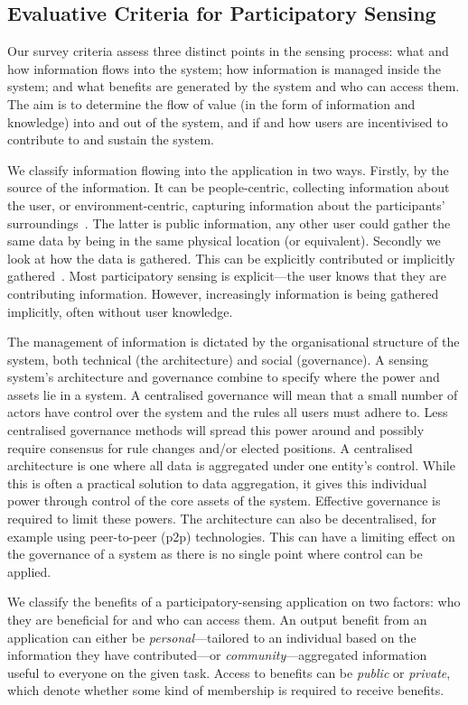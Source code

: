 \subsection{Evaluative Criteria for Participatory Sensing}

Our survey criteria assess three distinct points in the sensing process: what and how information flows into the system; how information is managed inside the system; and what benefits are generated by the system and who can access them. The aim is to determine the flow of value (in the form of information and knowledge) into and out of the system, and if and how users are incentivised to contribute to and sustain the system.

We classify information flowing into the application in two ways. 
Firstly, by the source of the information. It can be people-centric, collecting information about the user, or environment-centric, capturing information about the participants' surroundings~\citep{Kanhere2013}. The latter is public information, any other user could gather the same data by being in the same physical location (or equivalent). Secondly we look at how the data is gathered. This can be explicitly contributed or implicitly gathered~\citep{Shadbolt2013}. Most participatory sensing is explicit---the user knows that they are contributing information. However, increasingly information is being gathered implicitly, often without user knowledge.

The management of information is dictated by the organisational structure of the system, both technical (the architecture) and social (governance). A sensing system's architecture and governance combine to specify where the power and assets lie in a system. A centralised governance will mean that a small number of actors have control over the system and the rules all users must adhere to. Less centralised governance methods will spread this power around and possibly require consensus for rule changes and/or elected positions. A centralised architecture is one where all data is aggregated under one entity's control. 
While this is often a practical solution to data aggregation, it gives this individual power through control of the core assets of the system. 
Effective governance is required to limit these powers. The architecture can also be decentralised, for example using peer-to-peer (p2p) technologies. This can have a limiting effect on the governance of a system as there is no single point where control can be applied. 

We classify the benefits of a participatory-sensing application on two factors: who they are beneficial for and who can access them. 
An output benefit from an application can either be \emph{personal}---tailored to an individual based on the information they have contributed---or \emph{community}---aggregated information useful to everyone on the given task. 
Access to benefits can be \emph{public} or \emph{private}, which denote whether some kind of membership is required to receive benefits.

